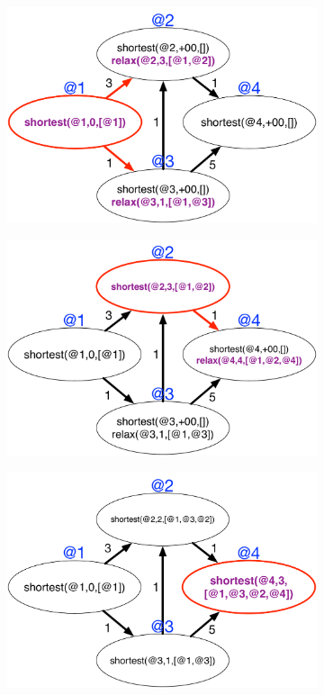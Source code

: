 \begin{figure}
\begin{center}
   \begin{subfigure}[b]{0.49\textwidth}
      \includegraphics[width=\textwidth]{figures/sssp/shortest2}
      \mycap{}
   \end{subfigure}
   \begin{subfigure}[b]{0.49\textwidth}
      \includegraphics[width=\textwidth]{figures/sssp/shortest3}
      \mycap{}
   \end{subfigure}
   \begin{subfigure}[b]{0.49\textwidth}
      \includegraphics[width=\textwidth]{figures/sssp/shortest8}

\end{subfigure}
\end{center}
\end{figure}
